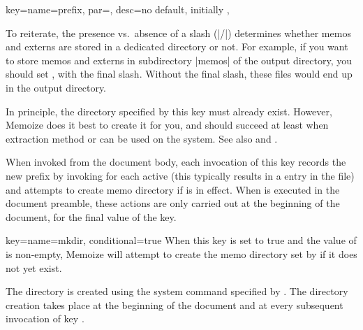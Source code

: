 \documentclass[a4paper,11pt]{article}
\begin{document}
\begin{doc}{
    key={name=prefix, par=,
      desc={no default, initially }},
  }
  \begin{tcolorbox}[warning,title=The final slash matters]
    To reiterate, the presence vs.\ absence of a slash (|/|) determines whether
    memos and externs are stored in a dedicated directory or not.  For example,
    if you want to store memos and externs in subdirectory |memos| of the
    output directory, you should set , with the
    final slash.  Without the final slash, these files would end up in the
    output directory.
  \end{tcolorbox}

  In principle, the directory specified by this key must already exist.
  However, Memoize does it best to create it for you, and should succeed at
  least when extraction method  or 
  can be used on the system.  See also  and .

  When invoked from the document body, each invocation of this key records the
  new prefix by invoking  for
  each active  (this typically results in a
   entry in the \dmmz file) and attempts to create memo
  directory if  is in effect.  When  is executed
  in the document preamble, these actions are only carried out at the beginning
  of the document, for the final value of the key.

  
\end{doc}

\begin{doc}{key={name=mkdir, conditional=true}}
  When this key is set to true and the value of  is
  non-empty, Memoize will attempt to create the memo directory set by
   if it does not yet exist.

  The directory is created using the system command specified by .  The directory creation takes place at the beginning of the
  document and at every subsequent invocation of key .
\end{doc}
\end{document}
